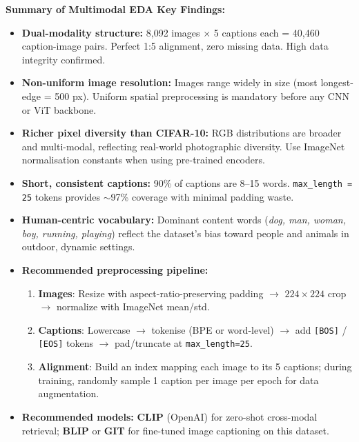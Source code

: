 \documentclass[twoside]{hcmut-report}
\begin{document}
\begin{importantbox}
\textbf{Summary of Multimodal EDA Key Findings:}
\begin{itemize}
    \item \textbf{Dual-modality structure:} 8{,}092 images $\times$ 5 captions each = 40{,}460 caption-image pairs. Perfect 1:5 alignment, zero missing data. High data integrity confirmed.
    \item \textbf{Non-uniform image resolution:} Images range widely in size (most longest-edge = 500 px). Uniform spatial preprocessing is mandatory before any CNN or ViT backbone.
    \item \textbf{Richer pixel diversity than CIFAR-10:} RGB distributions are broader and multi-modal, reflecting real-world photographic diversity. Use ImageNet normalisation constants when using pre-trained encoders.
    \item \textbf{Short, consistent captions:} 90\% of captions are 8--15 words. \texttt{max\_length = 25} tokens provides $\sim$97\% coverage with minimal padding waste.
    \item \textbf{Human-centric vocabulary:} Dominant content words (\textit{dog, man, woman, boy, running, playing}) reflect the dataset's bias toward people and animals in outdoor, dynamic settings.
    \item \textbf{Recommended preprocessing pipeline:}
    \begin{enumerate}
        \item \textbf{Images}: Resize with aspect-ratio-preserving padding $\rightarrow$ $224\times224$ crop $\rightarrow$ normalize with ImageNet mean/std.
        \item \textbf{Captions}: Lowercase $\rightarrow$ tokenise (BPE or word-level) $\rightarrow$ add \texttt{[BOS]} / \texttt{[EOS]} tokens $\rightarrow$ pad/truncate at \texttt{max\_length=25}.
        \item \textbf{Alignment}: Build an index mapping each image to its 5 captions; during training, randomly sample 1 caption per image per epoch for data augmentation.
    \end{enumerate}
    \item \textbf{Recommended models:} \textbf{CLIP} (OpenAI) for zero-shot cross-modal retrieval; \textbf{BLIP} or \textbf{GIT} for fine-tuned image captioning on this dataset.
\end{itemize}
\end{importantbox}

\newpage
\end{document}
